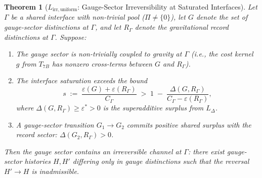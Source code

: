 \documentclass[11pt,a4paper]{article}
\newtheorem{theorem}{Theorem}[section]
\theoremstyle{definition}
\begin{document}
\begin{theorem}[$L_{\mathrm{irr,uniform}}$: Gauge-Sector Irreversibility at Saturated Interfaces]\label{thm:Lirr_uniform}
Let $\Gamma$ be a shared interface with non-trivial pool ($\Pi \ne \{0\}$),
let $G$ denote the set of gauge-sector distinctions at $\Gamma$, and let
$R_\Gamma$ denote the gravitational record distinctions at $\Gamma$.
Suppose:
\begin{enumerate}[label=(\alph*),nosep]
  \item The gauge sector is non-trivially coupled to gravity at $\Gamma$
  (i.e., the cost kernel $g$ from $T_{7B}$ has nonzero cross-terms
  between $G$ and $R_\Gamma$).
  \item The interface saturation exceeds the bound
  \begin{equation}
    s \;:=\; \frac{\varepsilon(G) + \varepsilon(R_\Gamma)}{C_\Gamma}
    \;>\; 1 \;-\; \frac{\Delta(G, R_\Gamma)}{C_\Gamma - \varepsilon(R_\Gamma)},
    \label{eq:saturation_bound}
  \end{equation}
  where $\Delta(G, R_\Gamma) \ge \varepsilon^* > 0$ is the superadditive
  surplus from $L_\Delta$.
  \item A gauge-sector transition $G_1 \to G_2$ commits positive shared
  surplus with the record sector: $\Delta(G_2, R_\Gamma) > 0$.
\end{enumerate}
Then the gauge sector contains an irreversible channel at $\Gamma$:
there exist gauge-sector histories $H, H'$ differing only in gauge
distinctions such that the reversal $H' \to H$ is inadmissible.
\end{theorem}
\end{document}
